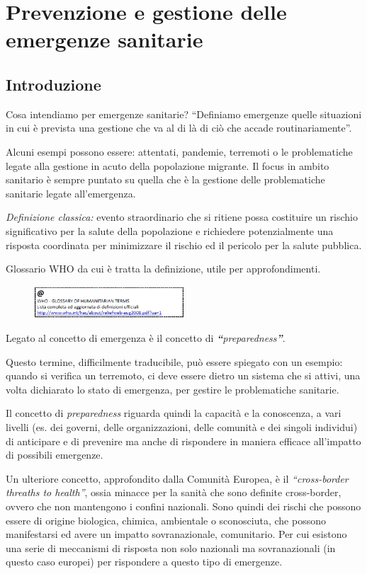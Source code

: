 \section{Prevenzione e gestione delle emergenze sanitarie}

\subsection{Introduzione}

Cosa intendiamo per emergenze sanitarie? ``Definiamo emergenze quelle
situazioni in cui è prevista una gestione che va al di là di ciò che
accade routinariamente''.

Alcuni esempi possono essere: attentati, pandemie, terremoti o le
problematiche legate alla gestione in acuto della popolazione migrante.
Il focus in ambito sanitario è sempre puntato su quella che è la
gestione delle problematiche sanitarie legate all'emergenza.

\emph{Definizione classica:} evento straordinario che si ritiene possa
costituire un rischio significativo per la salute della popolazione e
richiedere potenzialmente una risposta coordinata per minimizzare il
rischio ed il pericolo per la salute pubblica.

Glossario WHO da cui è tratta la definizione, utile per approfondimenti.

\begin{figure}[!ht]
\centering
	\includegraphics[width=0.5\textwidth]{26/image1.jpeg}
	\end{figure}

Legato al concetto di emergenza è il concetto di
\emph{\textbf{``}preparedness\textbf{''}}.

Questo termine, difficilmente traducibile, può essere spiegato con un
esempio: quando si verifica un terremoto, ci deve essere dietro un
sistema che si attivi, una volta dichiarato lo stato di emergenza, per
gestire le problematiche sanitarie.

Il concetto di \emph{preparedness} riguarda quindi la capacità e la
conoscenza, a vari livelli (es. dei governi, delle organizzazioni, delle
comunità e dei singoli individui) di anticipare e di prevenire ma anche
di rispondere in maniera efficace all'impatto di possibili emergenze.

Un ulteriore concetto, approfondito dalla Comunità Europea, è il
\emph{``cross-border threaths to health''}, ossia minacce per la sanità
che sono definite cross-border, ovvero che non mantengono i confini
nazionali. Sono quindi dei rischi che possono essere di origine
biologica, chimica, ambientale o sconosciuta, che possono manifestarsi
ed avere un impatto sovranazionale, comunitario. Per cui esistono una
serie di meccanismi di risposta non solo nazionali ma sovranazionali (in
questo caso europei) per rispondere a questo tipo di emergenze.

